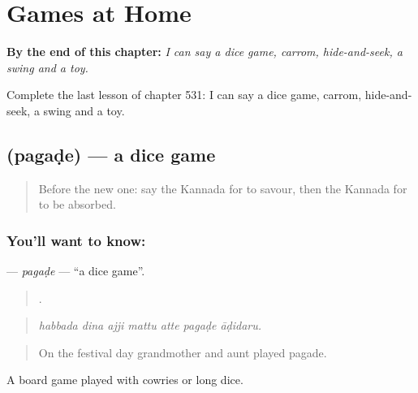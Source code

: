 
\chapter{Games at Home}
\label{ch:ka-games-at-home}

\begin{chapteropening}
\textbf{By the end of this chapter:} \emph{I can say a dice game, carrom, hide-and-seek, a swing and a toy.}

Complete the last lesson of chapter 531: I can say a dice game, carrom, hide-and-seek, a swing and a toy.
\end{chapteropening}

\section[\texorpdfstring{\kn{ಪಗಡೆ} (pagaḍe)}{ಪಗಡೆ (pagaḍe)}]{ (pagaḍe) — a dice game}

\label{lesson:KA-C531-pagade}



\begin{quote}
Before the new one: say the Kannada for to savour, then the Kannada for to be absorbed.
\end{quote}

\subsection*{You'll want to know: }
\textbf{} — \emph{pagaḍe} — \textquotedblleft{}a dice game\textquotedblright{}.

\begin{quote}
      .
\end{quote}

\begin{quote}
\emph{habbada dina ajji mattu atte pagaḍe āḍidaru.}
\end{quote}

\begin{quote}
On the festival day grandmother and aunt played pagade.
\end{quote}

A board game played with cowries or long dice.

